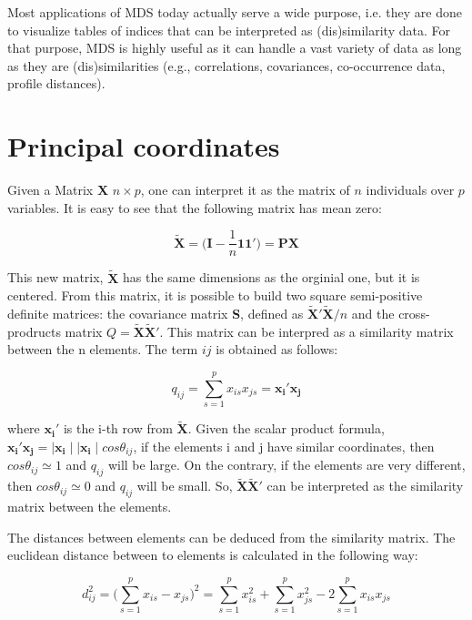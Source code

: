 \documentclass[11pt]{report}
\begin{document}
\indent Most applications of MDS today actually serve a wide purpose, i.e. they 
are done to visualize tables of indices that can be interpreted as 
(dis)similarity data. For that purpose, MDS is highly useful as it can handle a 
vast variety of data as long as they are (dis)similarities 
(e.g., correlations, covariances, co-occurrence data, profile distances).

\section{Principal coordinates}
Given a Matrix \textbf{X} $n \times p$, one can interpret it as the matrix of $n$ 
individuals over $p$ variables. It is easy to see that the following matrix
has mean zero:

$$\mathbf{\widetilde{X}} = \Big( \mathbf{I} - \frac{1}{n} \mathbf{1}\mathbf{1'}\Big) = \mathbf{P}\mathbf{X}$$

This new matrix, $\mathbf{\widetilde{X}}$ has the same dimensions as the orginial one, but
it is centered. From this matrix, it is possible to build two square semi-positive
definite matrices: the covariance matrix \textbf{S}, defined as 
$\mathbf{\widetilde{X}'}\mathbf{\widetilde{X}}/n$ and the cross-prodructs matrix 
$Q = \mathbf{\widetilde{X}}\mathbf{\widetilde{X}'}$. This matrix can be interpred as a similarity 
matrix between the n elements. The term $ij$ is obtained as follows:

\begin{equation} \label{qij}
q_{ij} = \sum_{s=1}^{p} x_{is}x_{js} = \mathbf{x_i'} \mathbf{x_j}
\end{equation}



where $\mathbf{x_i'}$ is the i-th row from $\mathbf{\widetilde{X}}$. 
Given the scalar product formula, $\mathbf{x_i'}\mathbf{x_j} =  \mid \mathbf{x_i} \mid \mid \mathbf{x_i} \mid cos\theta_{ij}$,
if the elements i and j have similar coordinates, then $cos\theta_{ij} \simeq 1$
and $q_{ij}$ will be large. On the contrary, if the elements are very different,
then $cos \theta_{ij} \simeq 0$ and $q_{ij}$ will be small. So, 
$\mathbf{\widetilde{X}}\mathbf{\widetilde{X}'}$ can be interpreted as the similarity
matrix between the elements.

\indent The distances between elements can be deduced from the similarity matrix.
The euclidean distance between to elements is calculated in the following way:

\begin{equation} \label{dij}
d^2_{ij} = \Big ( \sum_{s=1}^{p} x_{is}- x_{js} \Big )^2 = \sum_{s=1}^{p}x_{is}^2 + \sum_{s=1}^p x_{js}^2 - 2\sum_{s=1}^{p} x_{is}x_{js}
\end{equation}
\end{document}

